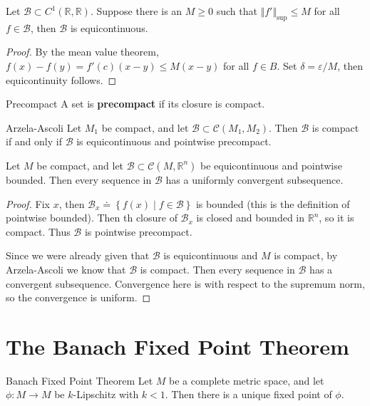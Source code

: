 \documentclass[10pt]{report}
\begin{document}
\begin{prop}
	Let $\mathcal{B} \subset C^1(\mathbb{R},\mathbb{R})$. Suppose there is an $M \geq 0$ such that $\Vert{f'}\Vert_{\sup} \leq M$ for all $f \in \mathcal{B}$, then $\mathcal{B}$ is equicontinuous.
\end{prop}
\begin{proof}
	By the mean value theorem, $f(x) - f(y) = f'(c) (x-y) \leq M (x-y)$ for all $f \in B$. Set $\delta = \varepsilon/M$, then equicontinuity follows.
\end{proof}

\begin{defn}{Precompact}{}
A set is \textbf{precompact} if its closure is compact.
\end{defn}

\begin{thrm}{Arzela-Ascoli}{}
	Let $M_1$ be compact, and let $\mathcal{B} \subset \mathcal{C}(M_1, M_2)$. Then $\mathcal{B}$ is compact if and only if $\mathcal{B}$ is equicontinuous and pointwise precompact.
\end{thrm}

\begin{cor}
	Let $M$ be compact, and let $\mathcal{B}\subset \mathcal{C}(M, \mathbb{R}^n)$ be equicontinuous and pointwise bounded. Then every sequence in $\mathcal{B}$ has a uniformly convergent subsequence.
\end{cor}
\begin{proof}
	Fix $x$, then $\mathcal{B}_x \doteq \left\{ f(x) \;|\; f \in \mathcal{B} \right\}$ is bounded (this is the definition of pointwise bounded). Then th closure of $\mathcal{B}_x $ is closed and bounded in $\mathbb{R}^n$, so it is compact. Thus $\mathcal{B}$ is pointwise precompact.

	Since we were already given that $\mathcal{B}$ is equicontinuous and $M$ is compact, by Arzela-Ascoli we know that $\mathcal{B}$ is compact. Then every sequence in $\mathcal{B}$ has a convergent subsequence. Convergence here is with respect to the supremum norm, so the convergence is uniform.
\end{proof}



\section{The Banach Fixed Point Theorem}

\begin{thrm}{Banach Fixed Point Theorem}{}
	Let $M$ be a complete metric space, and let $\phi:M \to M$ be $k$-Lipschitz with $k < 1$. Then there is a unique fixed point of $\phi$.
\end{thrm}
\end{document}
